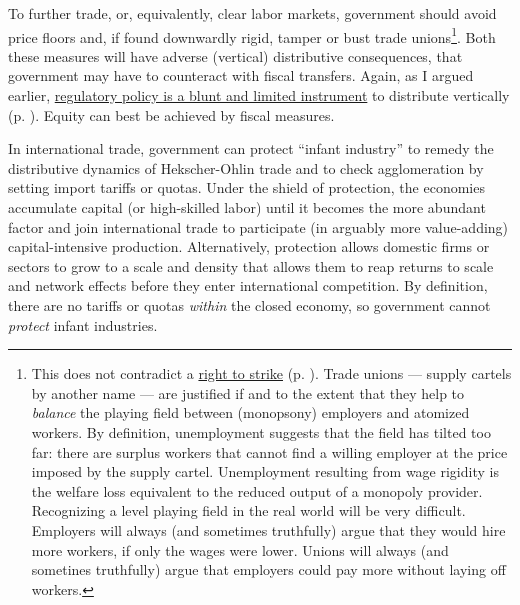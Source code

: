 To further trade, or, equivalently, clear labor markets, government should avoid price floors and, if found downwardly rigid, tamper or bust trade unions\footnote{
	This does not contradict a \hyperref[sec:redistributivepolicy]{right to strike} (p. \pageref{sec:redistributivepolicy}). Trade unions --- supply cartels by another name --- are justified if and to the extent that they help to \emph{balance} the playing field between (monopsony) employers and atomized workers. By definition, unemployment suggests that the field has tilted too far: there are surplus workers that cannot find a willing employer at the price imposed by the supply cartel. Unemployment resulting from wage rigidity is the welfare loss equivalent to the reduced output of a monopoly provider.\\
	Recognizing a level playing field in the real world will be very difficult. Employers will always (and sometimes truthfully) argue that they would hire more workers, if only the wages were lower. Unions will always (and sometines truthfully) argue that employers could pay more without laying off workers.}. 
Both these measures will have adverse (vertical) distributive consequences, that government may have to counteract with fiscal transfers. Again, as I argued earlier, \hyperref[sec:redistributivepolicy]{regulatory policy is a blunt and limited instrument} to distribute vertically (p. \pageref{sec:redistributivepolicy}). Equity can best be achieved by fiscal measures.

In international trade, government can protect ``infant industry'' to remedy the distributive dynamics of Hekscher-Ohlin trade and to check agglomeration by setting import tariffs or quotas. Under the shield of protection, the economies accumulate capital (or high-skilled labor) until it becomes the more abundant factor and join international trade to participate (in arguably more value-adding) capital-intensive production. Alternatively, protection allows domestic firms or sectors to grow to a scale and density that allows them to reap returns to scale and network effects before they enter international competition. By definition, there are no tariffs or quotas \emph{within} the closed economy, so government cannot \emph{protect} infant industries. %

